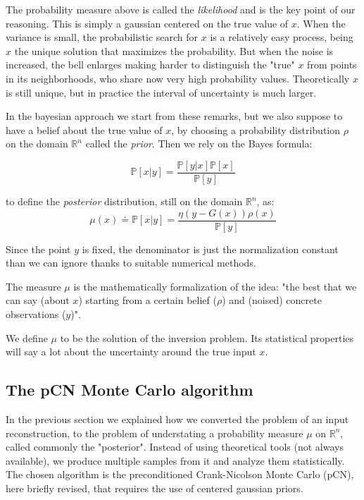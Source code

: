 \documentclass[9pt]{article}
\begin{document}
The probability measure above is called the \emph{likelihood} and is
the key point of our reasoning. This is simply a gaussian centered on the true
value of $x$.
When the variance is small, the probabilistic search for $x$ 
is a relatively easy process, being $x$ the unique solution
that maximizes the probability.
But when the noise is increased,
the bell enlarges making harder to distinguish the "true" $x$
from points in its neighborhoods, who share now very high
probability values.
Theoretically $x$ is still unique, but in practice the interval
of uncertainty is much larger.

In the bayesian approach we start from these remarks,
but we also suppose to have a belief about the true value of $x$,
by choosing a probability distribution $\rho$ on the domain
$\mathbb{R}^n$ called the
\emph{prior}.
Then we rely on the Bayes formula:

\begin{equation}
\mathbb{P}[x | y] = \frac{ \mathbb{P}[y | x] \mathbb{P}[x]} {\mathbb{P}[y]}
\end{equation}

to define the \emph{posterior} distribution, still on the domain
$\mathbb{R}^n$, as:
\begin{equation}
\mu (x) \doteq \mathbb{P}[x|y] = \frac{ \eta(y - G(x)) \rho(x)} {\mathbb{P}[y]}
\end{equation}


Since the point $y$ is fixed, the denominator is just the normalization
constant than we can ignore thanks to suitable numerical methods.


The measure $\mu$ is the mathematically
formalization of the idea: "the best that we can say (about $x$) starting
from a certain belief ($\rho$) and (noised) concrete observations ($y$)".


We define $\mu$ to be the solution of the inversion problem.
Its statistical properties will say a lot about the uncertainty around
the true input $x$.


\subsection{The pCN Monte Carlo algorithm}
In the previous section we explained how we converted the problem of
an input reconstruction, to the problem of understating a probability
measure $\mu$ on $\mathbb{R}^n$, called commonly the "posterior". 
Instead of using theoretical tools (not always available),
we produce multiple samples from it and analyze them statistically.
The chosen algorithm is the preconditioned Crank-Nicolson
Monte Carlo (pCN), here briefly revised, that requires the use of
centered gaussian priors.
\end{document}
